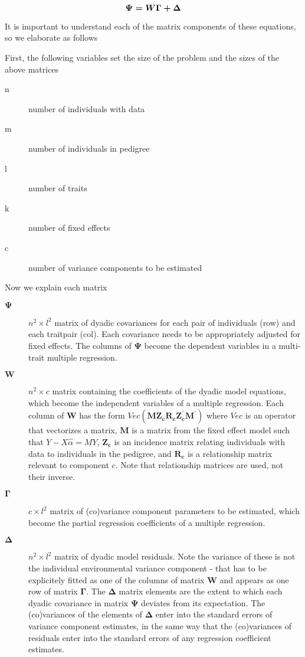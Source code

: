 \documentclass[titlepage,a4paper,12pt]{article}  %
\begin{document}
\begin{equation}
\mbox{\boldmath $\Psi = W \Gamma + \Delta$}   \label{eq:dme}
\end{equation}

It is important to understand each of the matrix components of these equations, so we elaborate as follows

First, the following variables set the size of the problem and the sizes of the above matrices
\begin{description}
\item[n] number of individuals with data
\item[m] number of individuals in pedigree
\item[l] number of traits
\item[k] number of fixed effects
\item[c] number of variance components to be estimated
\end{description}

Now we explain each matrix 
\begin{description}
\item[$\bm{\Psi}$] $n^{2} \times l^{2}$ matrix of dyadic covariances for each pair of individuals (row) and each traitpair (col). Each covariance needs to be appropriately adjusted for fixed effects. The columns of $\bm{\Psi}$ become the dependent variables in a multi-trait multiple regression.
\item[$\bm{W}$] $n^{2} \times c$ matrix containing the coefficients of the dyadic model equations, which become the independent variables of a multiple regression. Each column of $\bm{W}$ has the form $Vec{\bm{(MZ_{c} R_{c} Z_{c}^{\prime}M^{\prime})}}$ where $Vec$ is an operator that vectorizes a matrix, $\bm{M}$ is a matrix from the fixed effect model such that \mbox{\boldmath $Y - X \hat{\alpha} = M Y$}, $\bm{Z_{c}}$ is an incidence matrix relating individuals with data to individuals in the pedigree, and $\bm{R_{c}}$ is a relationship matrix relevant to component $c$. Note that relationship matrices are used, not their inverse.
\item[$\bm{\Gamma}$] $c \times l^{2}$ matrix of (co)variance component parameters to be estimated, which become the partial regression coefficients of a multiple regression.
\item[$\bm{\Delta}$] $n^{2} \times l^{2}$ matrix of dyadic model residuals. Note the variance of these is not the individual environmental variance component - that has to be explicitely fitted as one of the columns of matrix $\bm{W}$ and appears as one row of matrix $\bm{\Gamma}$. The $\bm{\Delta}$ matrix elements are the extent to which each dyadic covariance in matrix $\bm{\Psi}$ deviates from its expectation. The (co)variances of the elements of $\bm{\Delta}$ enter into the standard errors of variance component estimates, in the same way that the (co)variances of residuals enter into the standard errors of any regression coefficient estimates. 
\end{description}
\end{document}
